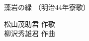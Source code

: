 \documentclass[10pt,b5j]{tarticle} %
\begin{document}
\begin{minipage}[c]{0.7\hsize} %
    \begin{center}
        {\LARGE
            藻岩の緑 %
        }
        {\small 
            （明治44年寮歌） %
        }
    \end{center}
\end{minipage}
\begin{minipage}[c]{0.3\hsize} %
    \begin{flushright} %
        松山茂助君 作歌\\柳沢秀雄君 作曲 %
    \end{flushright}
\end{minipage}
\end{document}
